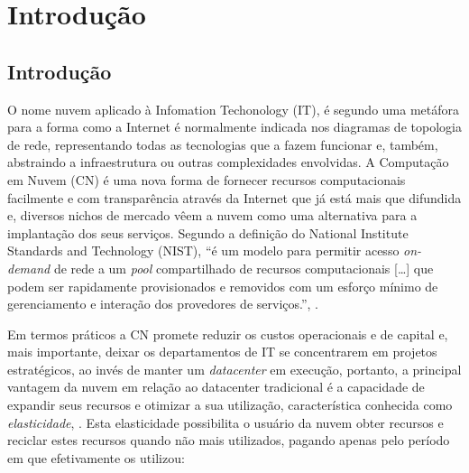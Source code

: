 
\part{Introdução}

\chapter*[Introdução]{Introdução}

O nome \textsf{nuvem} aplicado à \textsf{Infomation Techonology (IT)}, é segundo
 uma metáfora para a forma como a Internet é normalmente
indicada nos diagramas de topologia de rede, representando todas as tecnologias
que a fazem funcionar e, também, abstraindo a infraestrutura ou outras
complexidades envolvidas. A \textsf{Computação em Nuvem (CN)} é uma nova forma
de fornecer recursos computacionais facilmente e com transparência através da
Internet que já está mais que difundida e, diversos nichos de mercado vêem a
nuvem como uma alternativa para a implantação dos seus serviços. Segundo a
definição do \textsf{National Institute Standards and Technology (NIST)}, ``é um
modelo para permitir acesso \textit{on-demand} de rede a um \textit{pool}
compartilhado de recursos computacionais [\ldots] que podem ser rapidamente
provisionados e removidos com um esforço mínimo de gerenciamento e interação dos
provedores de serviços.'', .

Em termos práticos a CN promete reduzir os custos operacionais e de capital e,
mais importante, deixar os departamentos de IT se concentrarem em projetos
estratégicos, ao invés de manter um \textit{datacenter} em execução, portanto, a
principal vantagem da nuvem em relação ao datacenter tradicional é a capacidade
de expandir seus recursos e otimizar a sua utilização, característica conhecida
como \emph{elasticidade}, . Esta
elasticidade possibilita o usuário da nuvem obter recursos e reciclar estes
recursos quando não mais utilizados, pagando apenas pelo período em que
efetivamente os utilizou:

